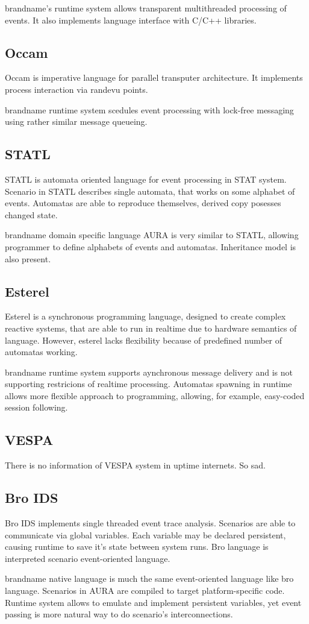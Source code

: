 brandname's runtime system allows transparent multithreaded processing of events. It also implements language interface with C/C++ libraries.

\subsection{Occam}

Occam is imperative language for parallel transputer architecture. It implements process interaction via randevu points.

brandname runtime system scedules event processing with lock-free messaging using rather similar message queueing.

\subsection{STATL}

STATL is automata oriented language for event processing in STAT system. Scenario in STATL describes single automata, that works on some alphabet of events. Automatas are able to reproduce themselves, derived copy posesses changed state.

brandname domain specific language AURA is very similar to STATL, allowing programmer to define alphabets of events and automatas. Inheritance model is also present.

\subsection{Esterel}

Esterel is a synchronous programming language, designed to create complex reactive systems, that are able to run in realtime due to hardware semantics of language. However, esterel lacks flexibility because of predefined number of automatas working. 

brandname runtime system supports aynchronous message delivery and is not supporting restricions of realtime processing. Automatas spawning in runtime allows more flexible approach to programming, allowing, for example, easy-coded session following.

\subsection{VESPA}

There is no information of VESPA system in uptime internets. So sad.

\subsection{Bro IDS}

Bro IDS implements single threaded event trace analysis. Scenarios are able to communicate via global variables. Each variable may be declared persistent, causing runtime to save it's state between system runs. Bro language is interpreted scenario event-oriented language.

brandname native language is much the same event-oriented language like bro language. Scenarios in AURA are compiled to target platform-specific code. Runtime system allows to emulate and implement persistent variables, yet event passing is more natural way to do scenario's interconnections.
